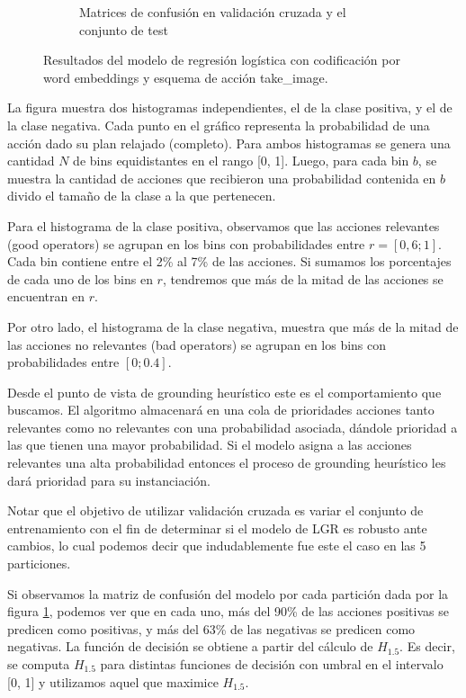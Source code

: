 \begin{figure}
\begin{subfigure}[b]{\textwidth}
    \endminipage
    \caption{Matrices de confusión en validación cruzada y el conjunto de test}
    \label{fig:takeimage-bestmodel-cm}
    \end{subfigure}
    \caption{Resultados del modelo de regresión logística con codificación por word embeddings y esquema de acción take\_image.}
    \label{fig:takeimage-bestmodel}
\end{figure}


La figura muestra dos histogramas independientes, el de la
clase positiva, y el de la clase negativa. Cada punto
en el gráfico representa la probabilidad de una
acción dado su plan relajado (completo). Para ambos histogramas
se genera una cantidad $N$ de bins equidistantes en el
rango [0, 1]. Luego, para cada bin $b$, se muestra la cantidad
de acciones que recibieron una probabilidad contenida
en $b$ divido el tamaño de la clase a la que pertenecen.

Para el histograma de la clase positiva, observamos
que las acciones relevantes (good operators) se agrupan
en los bins con
probabilidades entre $r=[0,6; 1]$. Cada bin contiene
entre el 2\% al 7\%
de las acciones. Si sumamos los porcentajes de cada uno
de los bins en $r$, tendremos que más de la mitad de las
acciones se encuentran en $r$.

Por otro lado, el histograma de la clase negativa, muestra
que más de la mitad de las acciones no relevantes 
(bad operators) se agrupan
en los bins con probabilidades
entre $[0;0.4]$.

Desde el punto de vista de grounding heurístico este es
el comportamiento que buscamos. El algoritmo almacenará
en una cola de prioridades acciones tanto relevantes
como no relevantes con una probabilidad asociada, dándole
prioridad a las que tienen una mayor probabilidad. Si
el modelo asigna a las acciones relevantes una alta probabilidad
entonces el proceso de grounding heurístico les dará prioridad
para su instanciación.

Notar que el objetivo de utilizar validación cruzada
es variar el conjunto de entrenamiento con
el fin de determinar si el modelo de LGR es robusto ante
cambios, lo cual podemos decir que indudablemente fue este
el caso en las 5 particiones.

Si observamos la matriz de confusión del modelo por cada partición dada por la figura \ref{fig:takeimage-bestmodel-cm},
podemos ver que en cada uno, más del 90\% de las acciones positivas
se predicen como positivas, y más del 63\% de las negativas se
predicen como negativas. La función de decisión se obtiene a partir del
cálculo de $H_{1.5}$. Es decir, se computa $H_{1.5}$ para distintas 
funciones de decisión con umbral en el intervalo [0, 1] y
utilizamos aquel que maximice $H_{1.5}$. 

